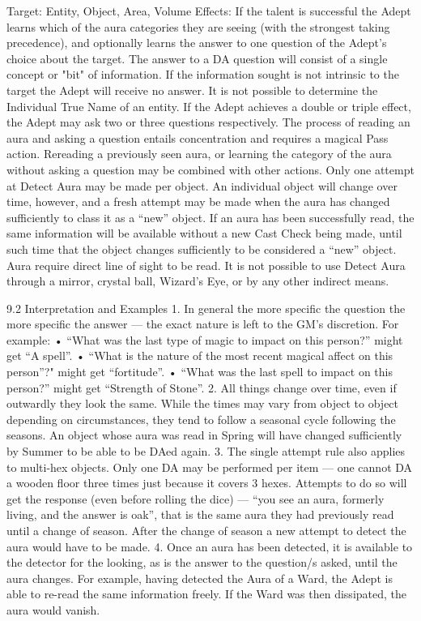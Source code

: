 \documentclass[a4paper]{article}
\begin{document}
\begin{multicols}{3}
Target: Entity, Object, Area, Volume
Effects: If the talent is successful the Adept learns
which of the aura categories they are seeing (with
the strongest taking precedence), and optionally
learns the answer to one question of the Adept’s
choice about the target. The answer to a DA question will consist of a single concept or "bit" of
information. If the information sought is not intrinsic to the target the Adept will receive no answer.
It is not possible to determine the Individual True
Name of an entity. If the Adept achieves a double
or triple effect, the Adept may ask two or three
questions respectively. The process of reading an
aura and asking a question entails concentration
and requires a magical Pass action. Rereading a
previously seen aura, or learning the category of
the aura without asking a question may be combined with other actions.
Only one attempt at Detect Aura may be made per
object. An individual object will change over time,
however, and a fresh attempt may be made when
the aura has changed sufficiently to class it as a
“new” object. If an aura has been successfully read,
the same information will be available without a
new Cast Check being made, until such time that
the object changes sufficiently to be considered a
“new” object.
Aura require direct line of sight to be read. It is not
possible to use Detect Aura through a mirror, crystal ball, Wizard’s Eye, or by any other indirect
means.

9.2 Interpretation and Examples
1. In general the more specific the question the
more specific the answer — the exact nature is left
to the GM’s discretion. For example:
• “What was the last type of magic to impact on
this person?” might get “A spell”.
• “What is the nature of the most recent magical
affect on this person”?" might get “fortitude”.
• “What was the last spell to impact on this person?” might get “Strength of Stone”.
2. All things change over time, even if outwardly
they look the same. While the times may vary from
object to object depending on circumstances, they
tend to follow a seasonal cycle following the seasons. An object whose aura was read in Spring will
have changed sufficiently by Summer to be able to
be DAed again.
3. The single attempt rule also applies to multi-hex
objects. Only one DA may be performed per item
— one cannot DA a wooden floor three times just
because it covers 3 hexes. Attempts to do so will
get the response (even before rolling the dice) —
“you see an aura, formerly living, and the answer is
oak”, that is the same aura they had previously read
until a change of season. After the change of season a new attempt to detect the aura would have to
be made.
4. Once an aura has been detected, it is available to
the detector for the looking, as is the answer to the
question/s asked, until the aura changes. For example, having detected the Aura of a Ward, the Adept
is able to re-read the same information freely. If the
Ward was then dissipated, the aura would vanish.


\end{multicols}
\end{document}
